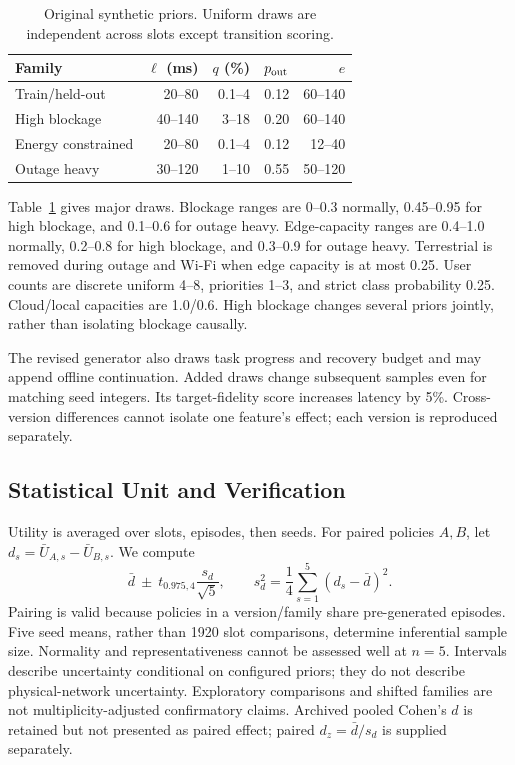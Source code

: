 \documentclass[10pt,twocolumn]{article}
\begin{document}
\begin{table}[t]
\caption{Original synthetic priors. Uniform draws are independent across slots except transition scoring.}\label{tab:families}
\centering\footnotesize
\begin{tabular}{lrrrr}
\toprule Family & $\ell$ (ms) & $q$ (\%) & $p_{\rm out}$ & $e$ \\
\midrule
Train/held-out & 20--80 & 0.1--4 & 0.12 & 60--140 \\
High blockage & 40--140 & 3--18 & 0.20 & 60--140 \\
Energy constrained & 20--80 & 0.1--4 & 0.12 & 12--40 \\
Outage heavy & 30--120 & 1--10 & 0.55 & 50--120 \\
\bottomrule\end{tabular}
\end{table}

Table~\ref{tab:families} gives major draws. Blockage ranges are 0--0.3 normally, 0.45--0.95 for high blockage, and 0.1--0.6 for outage heavy. Edge-capacity ranges are 0.4--1.0 normally, 0.2--0.8 for high blockage, and 0.3--0.9 for outage heavy. Terrestrial is removed during outage and Wi-Fi when edge capacity is at most 0.25. User counts are discrete uniform 4--8, priorities 1--3, and strict class probability 0.25. Cloud/local capacities are 1.0/0.6. High blockage changes several priors jointly, rather than isolating blockage causally.

The revised generator also draws task progress and recovery budget and may append offline continuation. Added draws change subsequent samples even for matching seed integers. Its target-fidelity score increases latency by 5\%. Cross-version differences cannot isolate one feature's effect; each version is reproduced separately.

\subsection{Statistical Unit and Verification}
Utility is averaged over slots, episodes, then seeds. For paired policies $A,B$, let $d_s=\bar U_{A,s}-\bar U_{B,s}$. We compute
\begin{equation}
\bar d\ \pm\ t_{0.975,4}\frac{s_d}{\sqrt5},\qquad
s_d^2=\frac{1}{4}\sum_{s=1}^5(d_s-\bar d)^2.\label{eq:ci}
\end{equation}
Pairing is valid because policies in a version/family share pre-generated episodes. Five seed means, rather than 1920 slot comparisons, determine inferential sample size. Normality and representativeness cannot be assessed well at $n=5$. Intervals describe uncertainty conditional on configured priors; they do not describe physical-network uncertainty. Exploratory comparisons and shifted families are not multiplicity-adjusted confirmatory claims. Archived pooled Cohen's $d$ is retained but not presented as paired effect; paired $d_z=\bar d/s_d$ is supplied separately.
\end{document}
